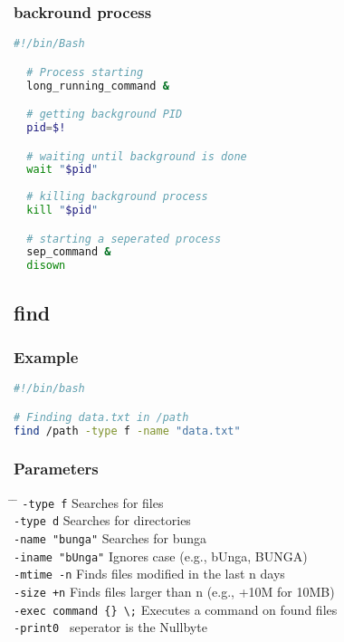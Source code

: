 \documentclass[a4paper,10pt]{article}
\begin{document}
\subsubsection{backround process}
\begin{lstlisting}[language=bash]
  #!/bin/Bash 

  # Process starting 
  long_running_command & 

  # getting background PID 
  pid=$! 

  # waiting until background is done 
  wait "$pid" 
  
  # killing background process 
  kill "$pid"

  # starting a seperated process 
  sep_command & 
  disown 

  \end{lstlisting}

\subsection{find}
\subsubsection*{Example}
\begin{lstlisting}[language=bash]
#!/bin/bash

# Finding data.txt in /path
find /path -type f -name "data.txt"
\end{lstlisting}

\subsubsection*{Parameters}
\begin{tabbing}
	\= \hspace{60mm} \= \hspace{80mm} \kill
	\> \verb|-type f| \> Searches for files \\
	\> \verb|-type d| \> Searches for directories \\
	\> \verb|-name "bunga"| \> Searches for bunga \\
	\> \verb|-iname "bUnga"| \> Ignores case (e.g., bUnga, BUNGA) \\
	\> \verb|-mtime -n| \> Finds files modified in the last n days \\
	\> \verb|-size +n| \> Finds files larger than n (e.g., +10M for 10MB) \\
	\> \verb|-exec command {} \;| \> Executes a command on found files \\
	\> \verb|-print0 | \> seperator is the Nullbyte \\
\end{tabbing}
\end{document}
